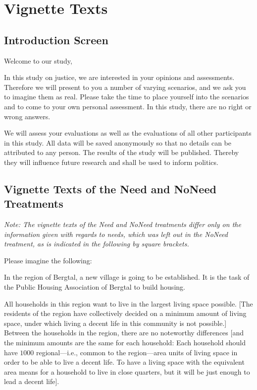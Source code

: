 \documentclass[12pt]{scrartcl}
\begin{document}
\clearpage
\section{Vignette Texts}\label{sec:app_vignette}
\subsection*{Introduction Screen}
\noindent Welcome to our study,

\noindent In this study on justice, we are interested in your opinions and assessments.
Therefore we will present to you a number of varying scenarios, and we ask you to imagine them as real.
Please take the time to place yourself into the scenarios and to come to your own personal assessment.
In this study, there are no right or wrong answers.

We will assess your evaluations as well as the evaluations of all other participants in this study.
All data will be saved anonymously so that no details can be attributed to any person.
The results of the study will be published.
Thereby they will influence future research and shall be used to inform politics.

\subsection*{Vignette Texts of the Need and NoNeed Treatments}
\textit{Note: The vignette texts of the Need and NoNeed treatments differ only on the information given with regards to needs, which was left out in the NoNeed treatment, as is indicated in the following by square brackets.}

\medskip{}
\noindent Please imagine the following:

\noindent In the region of Bergtal, a new village is going to be established.
It is the task of the Public Housing Association of Bergtal to build housing.

All households in this region want to live in the largest living space possible.
{[}The residents of the region have collectively decided on a minimum amount of living space, under which living a decent life in this community is not possible.{]}
Between the households in the region, there are no noteworthy differences {[}and the minimum amounts are the same for each household: Each household should have $1000$ regional---i.e., common to the region---area units of living space in order to be able to live a decent life.
To have a living space with the equivalent area means for a household to live in close quarters, but it will be just enough to lead a decent life{]}.
\end{document}
